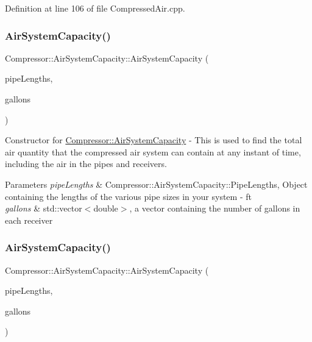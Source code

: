 Definition at line 106 of file Compressed\+Air.\+cpp.

\mbox{\label{class_compressor_1_1_air_system_capacity_a270fa85146172b46703970a1bc8fe724}} 
\subsubsection{\texorpdfstring{Air\+System\+Capacity()}{AirSystemCapacity()}\hspace{0.1cm}{\footnotesize\ttfamily [2/3]}}
{\footnotesize\ttfamily Compressor\+::\+Air\+System\+Capacity\+::\+Air\+System\+Capacity (\begin{DoxyParamCaption}\item[{\hyperlink{struct_compressor_1_1_pipe_data}{Pipe\+Data}}]{pipe\+Lengths,  }\item[{std\+::vector$<$ double $>$}]{gallons }\end{DoxyParamCaption})}

Constructor for \hyperlink{class_compressor_1_1_air_system_capacity}{Compressor\+::\+Air\+System\+Capacity} -\/ This is used to find the total air quantity that the compressed air system can contain at any instant of time, including the air in the pipes and receivers. 
\begin{DoxyParams}{Parameters}
{\em pipe\+Lengths} & Compressor\+::\+Air\+System\+Capacity\+::\+Pipe\+Lengths, Object containing the lengths of the various pipe sizes in your system -\/ ft \\
\hline
{\em gallons} & std\+::vector$<$double$>$, a vector containing the number of gallons in each receiver \\
\hline
\end{DoxyParams}
\mbox{\label{class_compressor_1_1_air_system_capacity_a270fa85146172b46703970a1bc8fe724}} 
\subsubsection{\texorpdfstring{Air\+System\+Capacity()}{AirSystemCapacity()}\hspace{0.1cm}{\footnotesize\ttfamily [3/3]}}
{\footnotesize\ttfamily Compressor\+::\+Air\+System\+Capacity\+::\+Air\+System\+Capacity (\begin{DoxyParamCaption}\item[{\hyperlink{struct_compressor_1_1_pipe_data}{Pipe\+Data}}]{pipe\+Lengths,  }\item[{std\+::vector$<$ double $>$}]{gallons }\end{DoxyParamCaption})}

